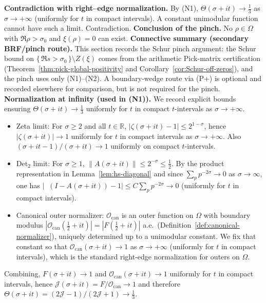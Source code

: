 \documentclass[11pt]{article}
\theoremstyle{definition}
\theoremstyle{remark}
\theoremstyle{definition}
\newcommand{\R}{\mathbb{R}}
\DeclareMathOperator{\dettwo}{det_2}
\begin{document}
\noindent\textbf{Contradiction with right--edge normalization.}
By (N1), $\Theta(\sigma+it)\to\tfrac13$ as $\sigma\to+\infty$ (uniformly for $t$ in compact intervals). A constant unimodular function cannot have such a limit. Contradiction.
\medskip
\noindent\textbf{Conclusion of the pinch.}
No $\rho\in\Omega$ with $\Re\rho>\sigma_0$ and $\xi(\rho)=0$ can exist.
\medskip
\noindent\textbf{Connective summary (secondary BRF/pinch route).}
This section records the Schur pinch argument: the Schur bound on $\{\,\Re s>\sigma_0\,\}\setminus Z(\xi)$ comes from the arithmetic Pick-matrix certification (Theorem~\ref{thm:pick-global-positivity} and Corollary~\ref{cor:Schur-off-zeros}), and the pinch uses only (N1)--(N2). A boundary-wedge route via \textup{(P+)} is optional and recorded elsewhere for comparison, but is not required for the pinch.
\medskip
\noindent\textbf{Normalization at infinity (used in (N1)).}
We record explicit bounds ensuring $\Theta(\sigma+it)\to\tfrac13$ uniformly for $t$ in compact $t$-intervals as $\sigma\to+\infty$.
\begin{itemize}
\item Zeta limit: For $\sigma\ge 2$ and all $t\in\R$, $|\zeta(\sigma+it)-1|\le 2^{1-\sigma}$, hence $|\zeta(\sigma+it)|\to 1$ uniformly for $t$ in compact intervals as $\sigma\to+\infty$. Also $(\sigma+it-1)/(\sigma+it)\to 1$ uniformly on compact $t$-intervals.
\item Det$_2$ limit: For $\sigma\ge 1$, $\|A(\sigma+it)\|\le 2^{-\sigma}\le \tfrac12$. By the product representation in Lemma~\ref{lem:hs-diagonal} and since $\sum_p p^{-2\sigma}\to0$ as $\sigma\to\infty$, one has $|\dettwo(I-A(\sigma+it)) - 1|\le C\sum_p p^{-2\sigma}\to 0$ (uniformly for $t$ in compact intervals).
\item Canonical outer normalizer: $\mathcal O_{\mathrm{can}}$ is an outer function on $\Omega$ with boundary modulus $|\mathcal O_{\mathrm{can}}(\tfrac12+it)|=|F(\tfrac12+it)|$ a.e.\ (Definition~\ref{def:canonical-normalizer}), uniquely determined up to a unimodular constant. We fix that constant so that $\mathcal O_{\mathrm{can}}(\sigma+it)\to 1$ as $\sigma\to+\infty$ (uniformly for $t$ in compact intervals), which is the standard right-edge normalization for outers on $\Omega$.
\end{itemize}
Combining, $F(\sigma+it)\to 1$ and $\mathcal O_{\mathrm{can}}(\sigma+it)\to 1$ uniformly for $t$ in compact intervals, hence $\mathcal J(\sigma+it)=F/\mathcal O_{\mathrm{can}}\to 1$ and therefore
\(\Theta(\sigma+it)=(2\mathcal J-1)/(2\mathcal J+1)\to\tfrac13\).
\end{document}
